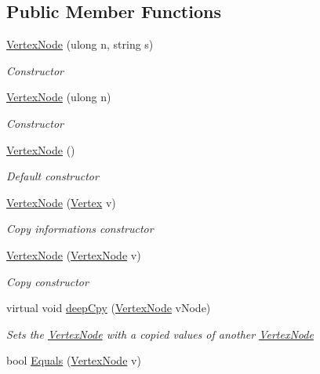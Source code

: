 \subsection*{Public Member Functions}
\begin{DoxyCompactItemize}
\item 
\hyperlink{classVertexNode_a354784337cef2fb0d38803aa728940f3}{Vertex\+Node} (ulong n, string s)
\begin{DoxyCompactList}\small\item\em Constructor \end{DoxyCompactList}\item 
\hyperlink{classVertexNode_a7704fbb6d0ce1ad606c2157461a3c737}{Vertex\+Node} (ulong n)
\begin{DoxyCompactList}\small\item\em Constructor \end{DoxyCompactList}\item 
\hyperlink{classVertexNode_a4b0f51a95aeda0ecdb5da3553875c3af}{Vertex\+Node} ()
\begin{DoxyCompactList}\small\item\em Default constructor \end{DoxyCompactList}\item 
\hyperlink{classVertexNode_ab9d2196f633d0bacc8c59f6e8b141784}{Vertex\+Node} (\hyperlink{structVertex}{Vertex} v)
\begin{DoxyCompactList}\small\item\em Copy informations constructor \end{DoxyCompactList}\item 
\hyperlink{classVertexNode_a6da3df0f6dcf1e9a52a4f5dbc20709a1}{Vertex\+Node} (\hyperlink{classVertexNode}{Vertex\+Node} v)
\begin{DoxyCompactList}\small\item\em Copy constructor \end{DoxyCompactList}\item 
virtual void \hyperlink{classVertexNode_a96d86fb78b39123012dd3dae3c5e0c58}{deep\+Cpy} (\hyperlink{classVertexNode}{Vertex\+Node} v\+Node)
\begin{DoxyCompactList}\small\item\em Sets the \hyperlink{classVertexNode}{Vertex\+Node} with a copied values of another \hyperlink{classVertexNode}{Vertex\+Node} \end{DoxyCompactList}\item 
bool \hyperlink{classVertexNode_a55725b134cc1d69dca62ec01df45d30d}{Equals} (\hyperlink{classVertexNode}{Vertex\+Node} v)

\end{DoxyCompactItemize}
